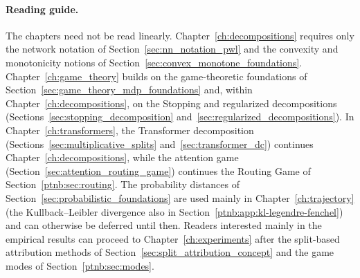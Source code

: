 \paragraph{Reading guide.}
The chapters need not be read linearly. Chapter~\ref{ch:decompositions} requires only the network notation of Section~\ref{sec:nn_notation_pwl} and the convexity and monotonicity notions of Section~\ref{sec:convex_monotone_foundations}. Chapter~\ref{ch:game_theory} builds on the game-theoretic foundations of Section~\ref{sec:game_theory_mdp_foundations} and, within Chapter~\ref{ch:decompositions}, on the Stopping and regularized decompositions (Sections~\ref{sec:stopping_decomposition} and~\ref{sec:regularized_decompositions}). In Chapter~\ref{ch:transformers}, the Transformer decomposition (Sections~\ref{sec:multiplicative_splits} and~\ref{sec:transformer_dc}) continues Chapter~\ref{ch:decompositions}, while the attention game (Section~\ref{sec:attention_routing_game}) continues the Routing Game of Section~\ref{ptnb:sec:routing}. The probability distances of Section~\ref{sec:probabilistic_foundations} are used mainly in Chapter~\ref{ch:trajectory} (the Kullback--Leibler divergence also in Section~\ref{ptnb:app:kl-legendre-fenchel}) and can otherwise be deferred until then. Readers interested mainly in the empirical results can proceed to Chapter~\ref{ch:experiments} after the split-based attribution methods of Section~\ref{sec:split_attribution_concept} and the game modes of Section~\ref{ptnb:sec:modes}.
